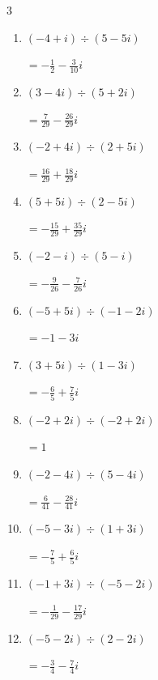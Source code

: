\begin{multicols}{3}
\begin{enumerate}
  \item $\displaystyle (-4+i)\div(5-5i)$

        $\displaystyle =-\frac{1}{2}-\frac{3}{10}i$

  \item $\displaystyle (3-4i)\div(5+2i)$

        $\displaystyle =\frac{7}{29}-\frac{26}{29}i$

  \item $\displaystyle (-2+4i)\div(2+5i)$

        $\displaystyle =\frac{16}{29}+\frac{18}{29}i$

  \item $\displaystyle (5+5i)\div(2-5i)$

        $\displaystyle =-\frac{15}{29}+\frac{35}{29}i$

  \item $\displaystyle (-2-i)\div(5-i)$

        $\displaystyle =-\frac{9}{26}-\frac{7}{26}i$

\columnbreak %

  \item $\displaystyle (-5+5i)\div(-1-2i)$

        $\displaystyle =-1-3i$

  \item $\displaystyle (3+5i)\div(1-3i)$

        $\displaystyle =-\frac{6}{5}+\frac{7}{5}i$

  \item $\displaystyle (-2+2i)\div(-2+2i)$

        $\displaystyle =1$

  \item $\displaystyle (-2-4i)\div(5-4i)$

        $\displaystyle =\frac{6}{41}-\frac{28}{41}i$

  \item $\displaystyle (-5-3i)\div(1+3i)$

        $\displaystyle =-\frac{7}{5}+\frac{6}{5}i$

  \item $\displaystyle (-1+3i)\div(-5-2i)$

        $\displaystyle =-\frac{1}{29}-\frac{17}{29}i$

  \item $\displaystyle (-5-2i)\div(2-2i)$

        $\displaystyle =-\frac{3}{4}-\frac{7}{4}i$


\end{enumerate}
\end{multicols}

